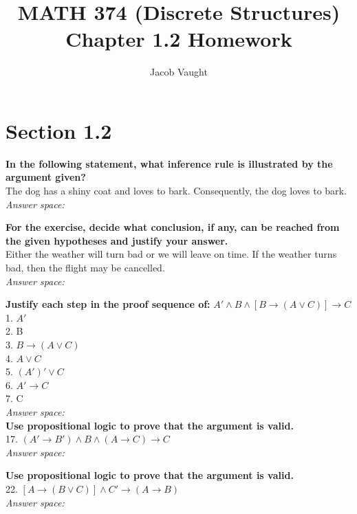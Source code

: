 \documentclass[12pt]{article}
\title{MATH 374 (Discrete Structures)\\Chapter 1.2 Homework}
\author{Jacob Vaught}
\begin{document}
\maketitle

\section*{Section 1.2}

\textbf{In the following statement, what inference rule is illustrated by the argument given?} \\
The dog has a shiny coat and loves to bark. Consequently, the dog loves to bark. \\
\textit{Answer space:} \\
\vspace{1cm}

\noindent
\textbf{For the exercise, decide what conclusion, if any, can be reached from the given hypotheses and justify your answer.} \\
Either the weather will turn bad or we will leave on time. If the weather turns bad, then the flight may be cancelled. \\
\textit{Answer space:} \\
\vspace{1cm}

\noindent
\textbf{Justify each step in the proof sequence of:} \( A' \land B \land [B \rightarrow (A \lor C)] \rightarrow C \) \\
1. \( A' \) \\
2. B \\
3. \( B \rightarrow (A \lor C) \) \\
4. \( A \lor C \) \\
5. \( (A')' \lor C \) \\
6. \( A' \rightarrow C \) \\
7. C \\
\textit{Answer space:} \\
\vspace{1cm}
\newpage
\noindent
\textbf{Use propositional logic to prove that the argument is valid.} \\
17. \( (A' \rightarrow B') \land B \land (A \rightarrow C) \rightarrow C \) \\
\textit{Answer space:} \\
\vspace{4cm}

\noindent
\textbf{Use propositional logic to prove that the argument is valid.} \\
22. \( [A \rightarrow (B \lor C)] \land C' \rightarrow (A \rightarrow B) \) \\
\textit{Answer space:} \\
\vspace{4cm}
\end{document}
